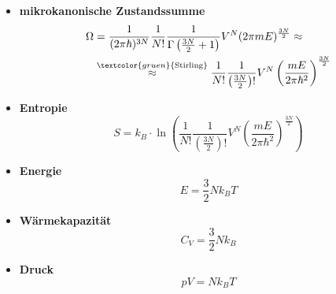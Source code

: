 \documentclass{article}
\newcommand{\diff}{\mathrm{d}}
\newcommand{\lr}[1]{\left(#1\right)}
\newcommand{\commenttext}[1]{\textcolor{gruen}{\text{#1}}}
\begin{document}
	\begin{itemize}
		\item \textbf{mikrokanonische Zustandssumme}
			\begin{align}
				\Omega &= \frac{1}{(2\pi\hbar)^{3N}} \frac{1}{N!} \frac{1}{\Gamma \lr{ \frac{3N}{2} + 1 }} V^N (2 \pi m E)^{\frac{3N}{2}} \approx \\
				&\stackrel{\commenttext{Stirling}}{\approx} \frac{1}{N!} \frac{1}{\lr{\frac{3N}{2}}!} V^N \lr{\frac{mE}{2\pi\hbar^2}}^{\frac{3N}{2}}
			\end{align}
		
		
		\item \textbf{Entropie}
			\begin{equation}
				S = k_B \cdot \ln \lr{ \frac{1}{N!} \frac{1}{\lr{\frac{3N}{2}}!} V^N \lr{\frac{mE}{2\pi\hbar^2}}^{\frac{3N}{2}} }
			\end{equation}
			
		
		\item \textbf{Energie}
			\begin{equation}
				E = \frac{3}{2} N k_B T
			\end{equation}
		
		
		\item \textbf{Wärmekapazität}
			\begin{equation}
				C_V = \frac{3}{2} N k_B
			\end{equation}
		
		
		\item \textbf{Druck}
			\begin{equation}
				p V = N k_B T
			\end{equation}
	\end{itemize}


%
%
%


\newpage
\end{document}
